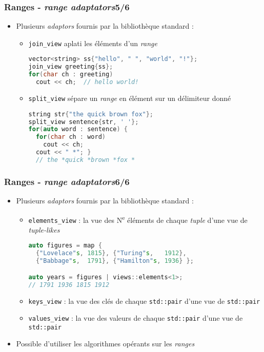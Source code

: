 \documentclass[C++.tex]{subfiles}
\begin{document}
\begin{frame}[fragile]
	\frametitle{Ranges - \textit{range adaptators}\titlehfill{}5/6}
	\begin{itemize}
		\item Plusieurs \textit{adaptors} fournis par la bibliothèque standard :
		\begin{itemize}
			\item \lstinline|join_view| \og aplati\fg{} les éléments d'un \textit{range}

\begin{lstlisting}[language=C++]
vector<string> ss{"hello", " ", "world", "!"};
join_view greeting{ss};
for(char ch : greeting)
  cout << ch;  // hello world!\end{lstlisting}

			\item \lstinline|split_view| sépare un \textit{range} en élément sur un délimiteur donné
			
			\begin{lstlisting}[language=C++]
string str{"the quick brown fox"};
split_view sentence{str, ' '};
for(auto word : sentence) {
  for(char ch : word)
    cout << ch;
  cout << " *"; }
  // the *quick *brown *fox *\end{lstlisting}

		\end{itemize}
	\end{itemize}
\end{frame}

\begin{frame}[fragile]
	\frametitle{Ranges - \textit{range adaptators}\titlehfill{}6/6}
	\begin{itemize}
		\item Plusieurs \textit{adaptors} fournis par la bibliothèque standard :
		\begin{itemize}
			\item \lstinline|elements_view| : la vue des N\textsuperscript{e} éléments de chaque \textit{tuple} d'une vue de \textit{tuple-likes}

			\begin{lstlisting}[language=C++]
auto figures = map {
  {"Lovelace"s, 1815}, {"Turing"s,   1912},
  {"Babbage"s,  1791}, {"Hamilton"s, 1936} };

auto years = figures | views::elements<1>;
// 1791 1936 1815 1912\end{lstlisting}

			\item \lstinline|keys_view| : la vue des clés de chaque \lstinline|std::pair| d'une vue de \lstinline|std::pair|
			\item \lstinline|values_view| : la vue des valeurs de chaque \lstinline|std::pair| d'une vue de \lstinline|std::pair|
		\end{itemize}
	\item Possible d'utiliser les algorithmes opérants sur les \textit{ranges}
	\end{itemize}
\end{frame}
\end{document}
